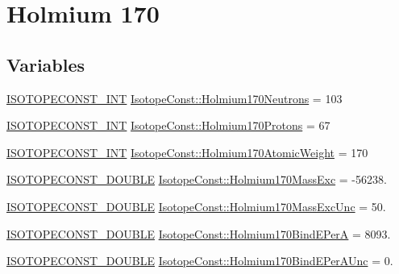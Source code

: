 \hypertarget{group___isotope_const-_holmium-_ho170}{}\section{Holmium 170}
\label{group___isotope_const-_holmium-_ho170}
\subsection*{Variables}
\begin{DoxyCompactItemize}
\item 
\mbox{\hyperlink{group___isotope_const-_macros_ga5f18360b3e99483a35c32d789e62621c}{I\+S\+O\+T\+O\+P\+E\+C\+O\+N\+S\+T\+\_\+\+I\+NT}} \mbox{\hyperlink{group___isotope_const-_holmium-_ho170_ga717d8c9dee590d6aa3fc011b188b8fd1}{Isotope\+Const\+::\+Holmium170\+Neutrons}} = 103
\item 
\mbox{\hyperlink{group___isotope_const-_macros_ga5f18360b3e99483a35c32d789e62621c}{I\+S\+O\+T\+O\+P\+E\+C\+O\+N\+S\+T\+\_\+\+I\+NT}} \mbox{\hyperlink{group___isotope_const-_holmium-_ho170_ga362ade632380fbb3a1310e7f9cc5484f}{Isotope\+Const\+::\+Holmium170\+Protons}} = 67
\item 
\mbox{\hyperlink{group___isotope_const-_macros_ga5f18360b3e99483a35c32d789e62621c}{I\+S\+O\+T\+O\+P\+E\+C\+O\+N\+S\+T\+\_\+\+I\+NT}} \mbox{\hyperlink{group___isotope_const-_holmium-_ho170_ga084826f0731b0d8c5bc23a1abc0a87b1}{Isotope\+Const\+::\+Holmium170\+Atomic\+Weight}} = 170
\item 
\mbox{\hyperlink{group___isotope_const-_macros_ga8f45a7272ce02c0b4c65c44636ed719a}{I\+S\+O\+T\+O\+P\+E\+C\+O\+N\+S\+T\+\_\+\+D\+O\+U\+B\+LE}} \mbox{\hyperlink{group___isotope_const-_holmium-_ho170_gaa858ff5001ba82aec75addb0a4a43c96}{Isotope\+Const\+::\+Holmium170\+Mass\+Exc}} = -\/56238.
\item 
\mbox{\hyperlink{group___isotope_const-_macros_ga8f45a7272ce02c0b4c65c44636ed719a}{I\+S\+O\+T\+O\+P\+E\+C\+O\+N\+S\+T\+\_\+\+D\+O\+U\+B\+LE}} \mbox{\hyperlink{group___isotope_const-_holmium-_ho170_ga44d74d5c52d5149e84726b245a53470d}{Isotope\+Const\+::\+Holmium170\+Mass\+Exc\+Unc}} = 50.
\item 
\mbox{\hyperlink{group___isotope_const-_macros_ga8f45a7272ce02c0b4c65c44636ed719a}{I\+S\+O\+T\+O\+P\+E\+C\+O\+N\+S\+T\+\_\+\+D\+O\+U\+B\+LE}} \mbox{\hyperlink{group___isotope_const-_holmium-_ho170_ga8b6e24bc5354a17bcf6a6e94d40be2fd}{Isotope\+Const\+::\+Holmium170\+Bind\+E\+PerA}} = 8093.
\item 
\mbox{\hyperlink{group___isotope_const-_macros_ga8f45a7272ce02c0b4c65c44636ed719a}{I\+S\+O\+T\+O\+P\+E\+C\+O\+N\+S\+T\+\_\+\+D\+O\+U\+B\+LE}} \mbox{\hyperlink{group___isotope_const-_holmium-_ho170_ga024ed77f83baeeaa0345f626595e7ac3}{Isotope\+Const\+::\+Holmium170\+Bind\+E\+Per\+A\+Unc}} = 0.

\end{DoxyCompactItemize}
